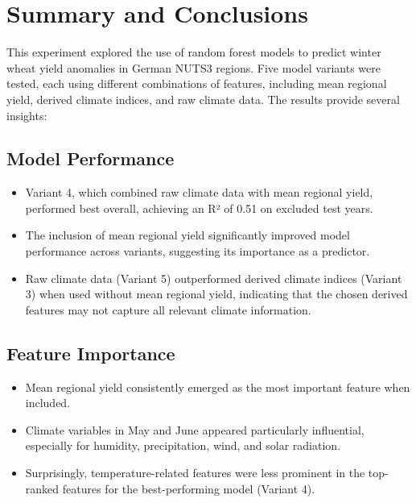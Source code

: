 \documentclass{article}
\begin{document}
\section{Summary and Conclusions}
This experiment explored the use of random forest models to predict winter wheat yield anomalies in German NUTS3 regions. Five model variants were tested, each using different combinations of features, including mean regional yield, derived climate indices, and raw climate data. The results provide several insights:

\subsection{Model Performance}
\begin{itemize}
	\item Variant 4, which combined raw climate data with mean regional yield, performed best overall, achieving an R² of 0.51 on excluded test years.
	\item The inclusion of mean regional yield significantly improved model performance across variants, suggesting its importance as a predictor.
	\item Raw climate data (Variant 5) outperformed derived climate indices (Variant 3) when used without mean regional yield, indicating that the chosen derived features may not capture all relevant climate information.
\end{itemize}

\subsection{Feature Importance}
\begin{itemize}
	\item Mean regional yield consistently emerged as the most important feature when included.
	\item Climate variables in May and June appeared particularly influential, especially for humidity, precipitation, wind, and solar radiation.
	\item Surprisingly, temperature-related features were less prominent in the top-ranked features for the best-performing model (Variant 4).
\end{itemize}
\end{document}
